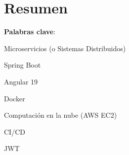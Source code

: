 \documentclass[12pt,twoside,titlepage]{report}
\begin{document}
\pagestyle{plain}





\setlength{\parskip}{0.75em}
\renewcommand{\baselinestretch}{1.25}

\setcounter{page}{2}











\chapter*{Resumen}



\mbox{} \bigskip

\noindent \textbf{Palabras clave}:
\begin{compactitem}
    \item Microservicios (o Sistemas Distribuidos)
    \item Spring Boot
    \item Angular 19
    \item Docker
    \item Computación en la nube (AWS EC2)
    \item CI/CD
    \item JWT
\end{compactitem}

\afterpage{\blankpage}
\end{document}

